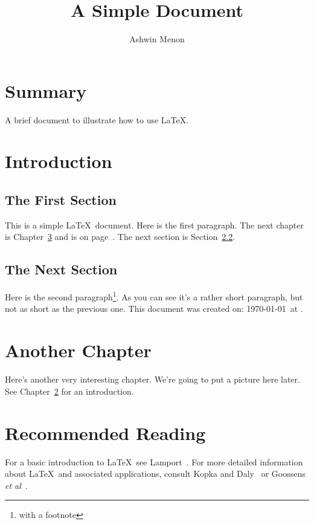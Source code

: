 \documentclass[12pt]{scrbook}
\title{A Simple Document}
\author{Ashwin Menon}
\begin{document}
\maketitle

\frontmatter
\tableofcontents

\chapter{Summary}
A brief document to
illustrate how to use \LaTeX.

\mainmatter

\chapter{Introduction}
\label{ch:intro}

\section{The First Section}
This is a simple \LaTeX\ document. Here is the first paragraph.
The next chapter is Chapter~\ref{ch:another}
and is on page~\pageref{ch:another}.
The next section is Section~\ref{sec:next}.

\section{The Next Section}
\label{sec:next}

Here is the second paragraph\footnote{with a footnote}. As you
can see it's a rather short paragraph, but not as short as the
previous one. This document was created on: \today\ at \currenttime.

\chapter{Another Chapter}
\label{ch:another}

Here's another very interesting chapter.
We're going to put a picture here later.
See Chapter~\ref{ch:intro} for an introduction.

\chapter{Recommended Reading}
For a basic introduction to \LaTeX\ see Lamport~\cite{lamport94}. For more
detailed information about \LaTeX\ and associated applications, consult
Kopka and Daly~\cite{kopka95} or Goossens \emph{et al}~\cite{goossens94}.
\end{document}
